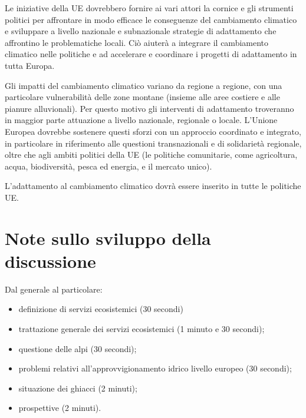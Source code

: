\documentclass[14pt,a4paper]{article}
\begin{document}
		Le iniziative della UE dovrebbero fornire ai vari attori la cornice e gli strumenti politici per affrontare in modo efficace le conseguenze del cambiamento climatico e
		sviluppare a livello nazionale e subnazionale
		strategie di adattamento che affrontino le problematiche locali. Ciò aiuterà a integrare il cambiamento climatico nelle politiche e ad accelerare e coordinare i progetti di
		adattamento in tutta Europa.
		
		Gli impatti del cambiamento climatico variano da
		regione a regione, con una particolare vulnerabilità
		delle zone montane (insieme alle aree costiere e
		alle pianure alluvionali). Per questo motivo gli
		interventi di adattamento troveranno in maggior
		parte attuazione a livello nazionale, regionale o
		locale. L'Unione Europea dovrebbe sostenere questi
		sforzi con un approccio coordinato e integrato,
		in particolare in riferimento alle questioni
		transnazionali e di solidarietà regionale, oltre
		che agli ambiti politici della UE (le politiche
		comunitarie, come agricoltura, acqua, biodiversità,
		pesca ed energia, e il mercato unico). 
		
		L'adattamento al cambiamento climatico dovrà essere inserito in tutte le politiche UE.
				
	\newpage
	
	
	
	\newpage
	\appendix
	\section*{Note sullo sviluppo della discussione}
	Dal generale al particolare:
	\begin{itemize}
		\item definizione di servizi ecosistemici (30 secondi)
		\item trattazione generale dei servizi ecosistemici (1 minuto e 30 secondi);
		\item questione delle alpi (30 secondi);
		\item problemi relativi all'approvvigionamento idrico livello europeo (30 secondi);
		\item situazione dei ghiacci (2 minuti);
		\item prospettive  (2 minuti).
	\end{itemize}
\end{document}
